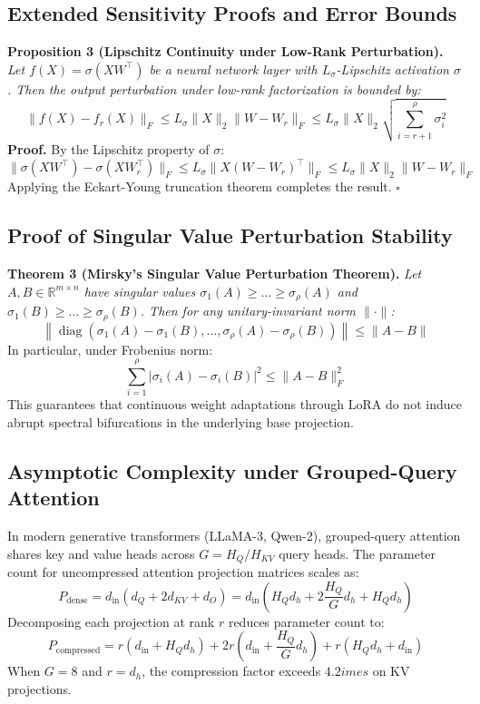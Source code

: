 \subsection*{Extended Sensitivity Proofs and Error Bounds}
\textbf{Proposition 3 (Lipschitz Continuity under Low-Rank Perturbation).} \textit{Let $f(X) = \sigma(X W^\top)$ be a neural network layer with $L_\sigma$-Lipschitz activation $\sigma$. Then the output perturbation under low-rank factorization is bounded by:}
\[
\|f(X) - f_r(X)\|_F \le L_\sigma \|X\|_2 \|W - W_r\|_F \le L_\sigma \|X\|_2 \sqrt{\sum_{i=r+1}^\rho \sigma_i^2}
\]
\textbf{Proof.} By the Lipschitz property of $\sigma$:
\[
\|\sigma(X W^\top) - \sigma(X W_r^\top)\|_F \le L_\sigma \|X (W - W_r)^\top\|_F \le L_\sigma \|X\|_2 \|W - W_r\|_F
\]
Applying the Eckart-Young truncation theorem completes the result. $\square$

\subsection*{Proof of Singular Value Perturbation Stability}
\textbf{Theorem 3 (Mirsky's Singular Value Perturbation Theorem).} \textit{Let $A, B \in \mathbb{R}^{m \times n}$ have singular values $\sigma_1(A) \ge \dots \ge \sigma_\rho(A)$ and $\sigma_1(B) \ge \dots \ge \sigma_\rho(B)$. Then for any unitary-invariant norm $\|\cdot\|$:}
\[
\left\| \operatorname{diag}(\sigma_1(A) - \sigma_1(B), \dots, \sigma_\rho(A) - \sigma_\rho(B)) \right\| \le \|A - B\|
\]
In particular, under Frobenius norm:
\[
\sum_{i=1}^\rho |\sigma_i(A) - \sigma_i(B)|^2 \le \|A - B\|_F^2
\]
This guarantees that continuous weight adaptations through LoRA do not induce abrupt spectral bifurcations in the underlying base projection.

\subsection*{Asymptotic Complexity under Grouped-Query Attention}
In modern generative transformers (LLaMA-3, Qwen-2), grouped-query attention shares key and value heads across $G = H_Q / H_{KV}$ query heads. The parameter count for uncompressed attention projection matrices scales as:
\[
P_{\text{dense}} = d_{\text{in}} \left( d_Q + 2 d_{KV} + d_O \right) = d_{\text{in}} \left( H_Q d_h + 2 \frac{H_Q}{G} d_h + H_Q d_h \right)
\]
Decomposing each projection at rank $r$ reduces parameter count to:
\[
P_{\text{compressed}} = r \left( d_{\text{in}} + H_Q d_h \right) + 2 r \left( d_{\text{in}} + \frac{H_Q}{G} d_h \right) + r \left( H_Q d_h + d_{\text{in}} \right)
\]
When $G = 8$ and $r = d_h$, the compression factor exceeds $4.2	imes$ on KV projections.

